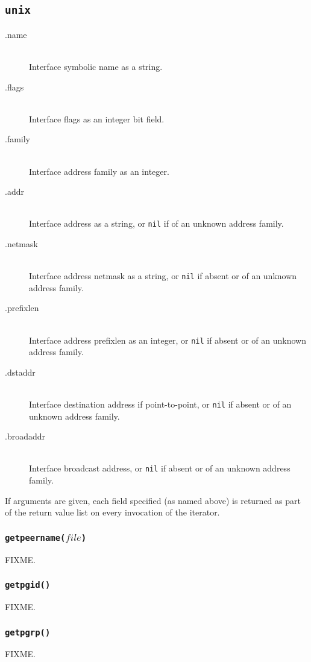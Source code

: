 \documentclass[11pt, oneside]{memoir}
\newcommand*{\nil}[0]{\texttt{nil}\xspace}
\newcommand*{\fn}[1]{\texttt{#1}\xspace}
\newcounter{toccols}
\newenvironment{Module}[1]{
	\subsection{\texttt{#1}}
	\addtocontents{toc}{
		\protect\begin{multicols}{\value{toccols}}
	}
}{
	\addtocontents{toc}{\protect\end{multicols}}
}
\begin{document}
\begin{Module}{unix}
\begin{description}
\item[.name] \hfill \\
Interface symbolic name as a string.
\item[.flags] \hfill \\
Interface flags as an integer bit field.
\item[.family] \hfill \\
Interface address family as an integer.
\item[.addr] \hfill \\
Interface address as a string, or \nil if of an unknown address family.
\item[.netmask] \hfill \\
Interface address netmask as a string, or \nil if absent or of an unknown address family.
\item[.prefixlen] \hfill \\
Interface address prefixlen as an integer, or \nil if absent or of an unknown address family.
\item[.dstaddr] \hfill \\
Interface destination address if point-to-point, or \nil if absent or of an unknown address family.
\item[.broadaddr] \hfill \\
Interface broadcast address, or \nil if absent or of an unknown address family.
\end{description}

If arguments are given, each field specified (as named above) is returned as part of the return value list on every invocation of the iterator.

\subsubsection[\fn{getpeername}]{\fn{getpeername($file$)}}

FIXME.

\subsubsection[\fn{getpgid}]{\fn{getpgid()}}

FIXME.

\subsubsection[\fn{getpgrp}]{\fn{getpgrp()}}

FIXME.


\end{Module}
\end{document}
